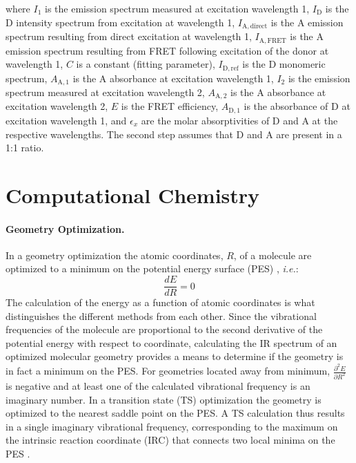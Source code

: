  where $I_1$ is the emission spectrum measured at excitation wavelength 1, $I_\mathrm{D}$ is the D intensity spectrum from excitation at wavelength 1, $I_\mathrm{A,direct}$ is the A emission spectrum resulting from direct excitation at wavelength 1, $I_\mathrm{A,FRET}$ is the A emission spectrum resulting from FRET following excitation of the donor at wavelength 1, $C$ is a constant (fitting parameter), $I_\mathrm{D,ref}$ is the D monomeric spectrum, $A_\mathrm{A,1}$ is the A absorbance at excitation wavelength 1, $I_2$ is the emission spectrum measured at excitation wavelength 2, $A_\mathrm{A,2}$ is the A absorbance at excitation wavelength 2, $E$ is the FRET efficiency, $A_\mathrm{D,1}$ is the absorbance of D at excitation wavelength 1, and $\epsilon_x$ are the molar absorptivities of D and A at the respective wavelengths. The second step assumes that D and A are present in a 1:1 ratio.

\section{Computational Chemistry}

 \paragraph{Geometry Optimization.}  In a geometry optimization the atomic coordinates, $R$, of a molecule are optimized to a minimum on the potential energy surface (PES) \cite{FrankJensenCC}, \emph{i.e.}:
\begin{equation}
\frac{dE}{dR} = 0
\end{equation}
 The calculation of the energy as a function of atomic coordinates is what distinguishes the different methods from each other. Since the vibrational frequencies of the molecule are proportional to the second derivative of the potential energy with respect to coordinate, calculating the IR spectrum of an optimized molecular geometry provides a means to determine if the geometry is in fact a minimum on the PES. For geometries located away from minimum, $\frac{\partial^2E}{\partial R^2}$ is negative and at least one of the calculated vibrational frequency is an imaginary number. In a transition state (TS) optimization the geometry is optimized to the nearest saddle point on the PES. A TS calculation thus results in a single imaginary vibrational frequency, corresponding to the maximum on the intrinsic reaction coordinate (IRC) that connects two local minima on the PES \cite{FrankJensenCC}.


